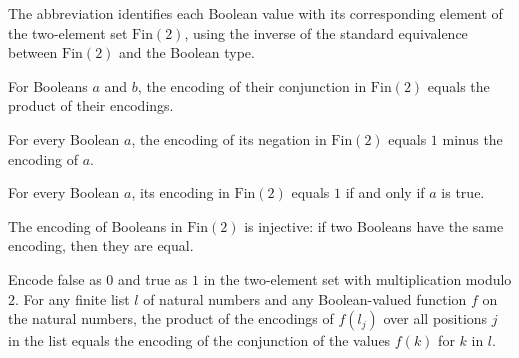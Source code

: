 \begin{definition}
\label{BoolCircuit.b2f}
\leanok
The abbreviation identifies each Boolean value with its corresponding element of the
two-element set $\mathrm{Fin}(2)$, using the inverse of the standard equivalence
between $\mathrm{Fin}(2)$ and the Boolean type.
\end{definition}

\begin{theorem}
\label{BoolCircuit.b2f_and}
\leanok
{}
For Booleans $a$ and $b$, the encoding of their conjunction in $\mathrm{Fin}(2)$ equals
the product of their encodings.
\end{theorem}

\begin{theorem}
\label{BoolCircuit.b2f_not}
\leanok
{}
For every Boolean $a$, the encoding of its negation in $\mathrm{Fin}(2)$ equals $1$
minus the encoding of $a$.
\end{theorem}

\begin{theorem}
\label{BoolCircuit.b2f_eq_one_iff}
\leanok
{}
For every Boolean $a$, its encoding in $\mathrm{Fin}(2)$ equals $1$ if and only if $a$
is true.
\end{theorem}

\begin{theorem}
\label{BoolCircuit.b2f_injective}
\leanok
{}
The encoding of Booleans in $\mathrm{Fin}(2)$ is injective: if two Booleans have the
same encoding, then they are equal.
\end{theorem}

\begin{theorem}
\label{BoolCircuit.prod_b2f_getElem}
\leanok
{}
Encode false as $0$ and true as $1$ in the two-element set with multiplication modulo
$2$. For any finite list $l$ of natural numbers and any Boolean-valued function $f$ on
the natural numbers, the product of the encodings of $f(l_j)$ over all positions $j$ in
the list equals the encoding of the conjunction of the values $f(k)$ for $k$ in $l$.
\end{theorem}

